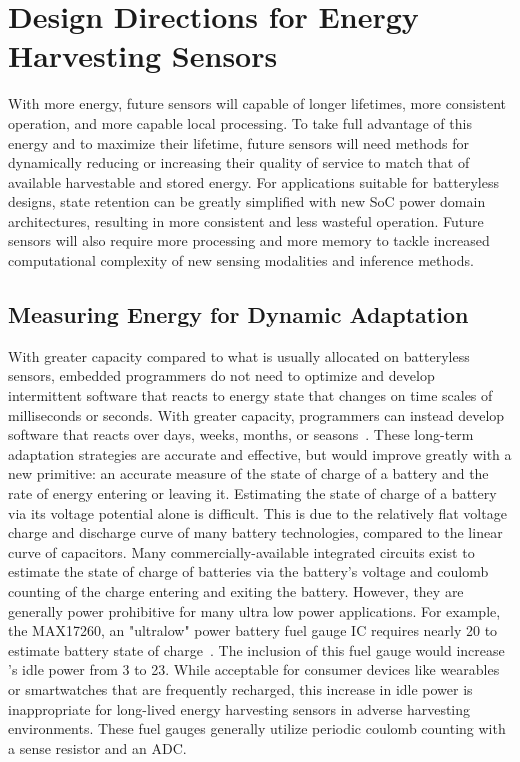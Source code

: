 \section{Design Directions for Energy Harvesting Sensors}
With more energy, future sensors will capable of longer lifetimes, more consistent operation, and more capable local processing. To take full advantage of this energy and to maximize their lifetime, future sensors will need methods for dynamically reducing or increasing their quality of service to match that of available harvestable and stored energy.
For applications suitable for batteryless designs, state retention can be greatly simplified with new SoC power domain architectures, resulting in more consistent and less wasteful operation. Future sensors will also require more processing and more memory to tackle increased computational complexity of new sensing modalities and inference methods.

\subsection{Measuring Energy for Dynamic Adaptation}
With greater capacity compared to what is usually allocated on batteryless sensors, embedded programmers do not need to optimize and develop intermittent software that reacts to energy state that changes on time scales of milliseconds or seconds. With greater capacity, programmers can instead develop software that reacts over days, weeks, months, or seasons~\cite{ahmed2019optimal}.
These long-term adaptation strategies are accurate and effective, but would improve greatly with a new primitive: an accurate measure of the state of charge of a battery and the rate of energy entering or leaving it.
Estimating the state of charge of a battery via its voltage potential alone is difficult. 
This is due to the relatively flat voltage charge and discharge curve of many battery technologies, compared to the linear curve of capacitors.
Many commercially-available integrated circuits exist to estimate the state of charge of batteries via the battery's voltage and coulomb counting of the charge entering and exiting the battery.
However, they are generally power prohibitive for many ultra low power applications. 
For example, the MAX17260, an "ultralow" power battery fuel gauge IC requires nearly 20\ssi{\micro\watt} to estimate battery state of charge~\cite{max17260}.
The inclusion of this fuel gauge would increase \name{}'s idle power from 3\ssi{\micro\watt} to 23\ssi{\micro\watt}.
While acceptable for consumer devices like wearables or smartwatches that are frequently recharged, this increase in idle power is inappropriate for long-lived energy harvesting sensors in adverse harvesting environments. 
These fuel gauges generally utilize periodic coulomb counting with a sense resistor and an ADC. 

